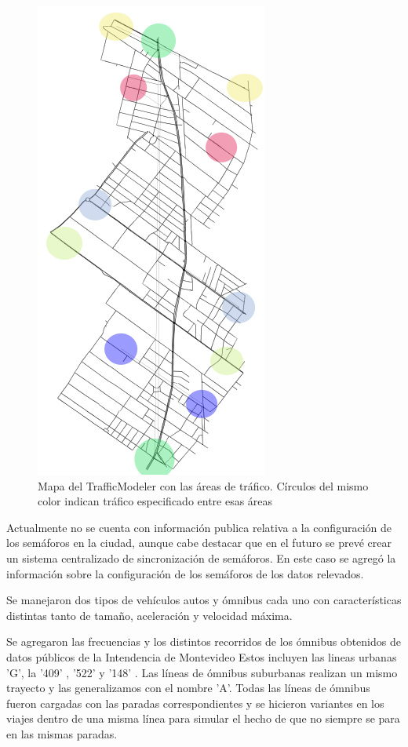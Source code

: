 \begin{figure}[H]
\centering
\includegraphics[width=0.4\linewidth]{Figures/areaflow1}
\caption{Mapa del TrafficModeler con las áreas de tráfico. Círculos del mismo color indican tráfico especificado entre esas áreas}
\label{fig:areaflow1}
\end{figure}


Actualmente no se cuenta con información publica relativa a la configuración de los semáforos en la ciudad, aunque cabe destacar que en el futuro se prevé crear un sistema centralizado de sincronización de semáforos. \citep{OBS01} 
En este caso se agregó la información sobre la configuración de los semáforos de los datos relevados.

Se manejaron dos tipos de vehículos autos y ómnibus cada uno con características distintas tanto de tamaño, aceleración y velocidad máxima.

Se agregaron las frecuencias y los distintos recorridos de los ómnibus obtenidos de datos públicos de la Intendencia de Montevideo \citep{IMM}
Estos incluyen las lineas urbanas  'G',  la  '409' , '522'  y  '148' . Las líneas de ómnibus suburbanas realizan  un mismo  trayecto y las generalizamos con el nombre 'A'.  
Todas  las  líneas  de  ómnibus
fueron cargadas con las paradas correspondientes y se
hicieron  variantes  en  los  viajes  dentro  de  una  misma
línea para simular el hecho de que no siempre se para en las mismas paradas.




